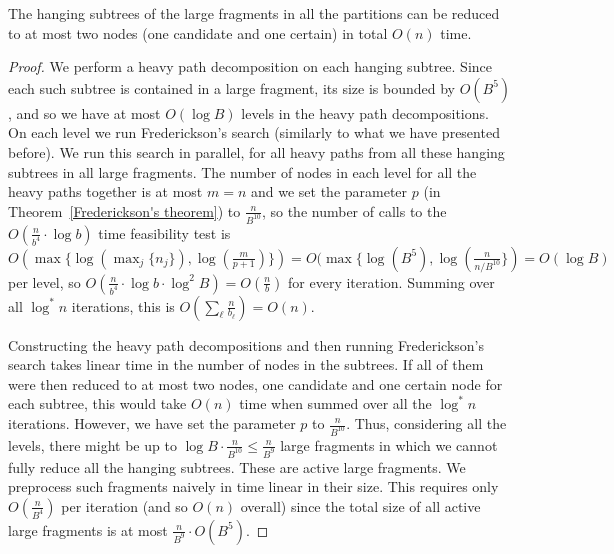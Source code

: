 \documentclass[a4paper,UKenglish]{lipics-v2016}
\theoremstyle{plain}
\begin{document}
\begin{lemma}\label{lemma1}
	The hanging subtrees of the large fragments in all the partitions can be reduced to at most two nodes (one candidate and one certain) in total $O(n)$ time. 
\end{lemma}
\begin{proof}
We 
perform a heavy path decomposition on each hanging subtree. Since each such subtree is contained in a large fragment, its 
size is bounded by $O(B^5)$, and so we have at most $O(\log B)$ levels in the heavy 
path decompositions. On each level we run Frederickson's search (similarly to what we have presented before).
We run this search in parallel, for all heavy paths from all these hanging subtrees in all large fragments.
The number of  nodes in each level for all the heavy paths together is at most $m=n$ and we set
the parameter $p$ (in Theorem~\ref{Frederickson's theorem}) to $\frac{n}{B^{10}}$, so the number of calls to the $O(\frac{n}{b^4} \cdot \log b)$ time feasibility test
is $O(\max \lbrace \log(\max_{j} \lbrace n_j \rbrace), \log(\frac{m}{p+1}) \rbrace) = O(\max \lbrace \log (B^{5}), \log(\frac{n}{n/B^{10}} \rbrace) = O(\log B)$ per level, so
$O(\frac{n}{b^4} \cdot \log b \cdot \log^{2} B) = O(\frac{n}{b})$ for every iteration.
Summing over all $\log^{*}n$ iterations, this is $O(\sum_{\ell}\frac{n}{b_\ell}) = O(n)$.

Constructing the heavy path decompositions and then running Frederickson's search takes linear time in the number
of nodes in the subtrees. If all of them were then reduced to at most two nodes, one candidate and one certain
node for each subtree, this would take $O(n)$ time when summed over all the $\log^{*}n$  iterations. However, we have set
the parameter $p$ to $\frac{n}{B^{10}}$. Thus, considering all the levels, there
might be up to $\log B\cdot\frac{n}{B^{10}}\leq \frac{n}{B^{9}}$ large fragments in which we cannot fully reduce
all the hanging subtrees. These are active large fragments. We preprocess such fragments naively in time linear in their size. 
This requires only $O(\frac{n}{B^{4}})$ per iteration (and so $O(n)$ overall) since the total size of all active large fragments is at most
$\frac{n}{B^9} \cdot O(B^5)$. 
\end{proof}
\end{document}

